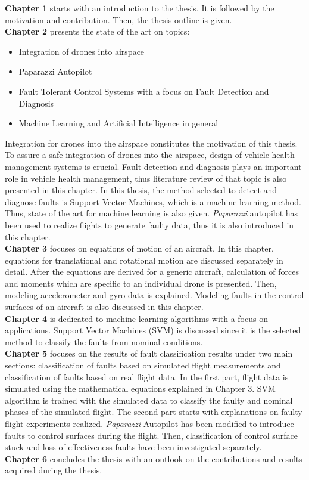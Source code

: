 \textbf{Chapter 1} starts with an introduction to the thesis. It is followed by the motivation and contribution. Then, the thesis outline is given.\\
\textbf{Chapter 2} presents the state of the art on topics: 
\begin{itemize}
\item{Integration of drones into airspace}
\item{Paparazzi Autopilot}
\item{Fault Tolerant Control Systems with a focus on Fault Detection and Diagnosis}
\item{Machine Learning and Artificial Intelligence in general}
\end{itemize}
Integration for drones into the airspace constitutes the motivation of this thesis. To assure a safe integration of drones into the airspace, design of vehicle health management systems is crucial. Fault detection and diagnosis plays an important role in vehicle health management, thus literature review of that topic is also presented in this chapter. In this thesis, the method selected to detect and diagnose faults is Support Vector Machines, which is a machine learning method. Thus, state of the art for machine learning is also given. \emph{Paparazzi} autopilot has been used to realize flights to generate faulty data, thus it is also introduced in this chapter.\\
\textbf{Chapter 3} focuses on equations of motion of an aircraft. In this chapter, equations for translational and rotational motion are discussed separately in detail. After the equations are derived for a generic aircraft, calculation of forces and moments which are specific to an individual drone is presented. Then, modeling accelerometer and gyro data is explained. Modeling faults in the control surfaces of an aircraft is also discussed in this chapter.\\
\textbf{Chapter 4} is dedicated to machine learning algorithms with a focus on applications. Support Vector Machines (SVM) is discussed since it is the selected method to classify the faults from nominal conditions.\\
\textbf{Chapter 5} focuses on the results of fault classification results under two main sections: classification of faults based on simulated  flight measurements and classification of faults based on real flight data. In the first part, flight data is simulated using the mathematical equations explained in Chapter 3. SVM algorithm is trained with the simulated data to classify the faulty and nominal phases of the simulated flight. The second part starts with explanations on faulty flight experiments realized. \emph{Paparazzi} Autopilot has been modified to introduce faults to control surfaces during the flight. Then, classification of control surface stuck and loss of effectiveness faults have been investigated separately.\\
\textbf{Chapter 6} concludes the thesis with an outlook on the contributions and results acquired during the thesis.